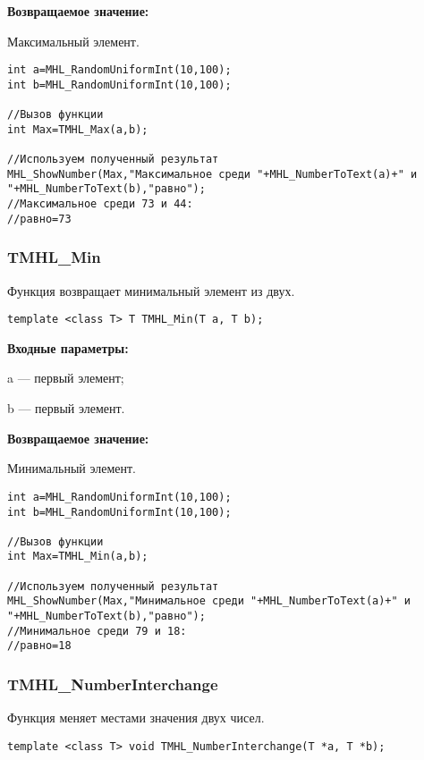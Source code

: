 \documentclass[a4paper,12pt]{article}
\begin{document}
\textbf{Возвращаемое значение:}

Максимальный элемент.


\begin{lstlisting}[label=code_use_TMHL_Max,caption=Пример использования]
int a=MHL_RandomUniformInt(10,100);
int b=MHL_RandomUniformInt(10,100);

//Вызов функции
int Max=TMHL_Max(a,b);

//Используем полученный результат
MHL_ShowNumber(Max,"Максимальное среди "+MHL_NumberToText(a)+" и "+MHL_NumberToText(b),"равно");
//Максимальное среди 73 и 44:
//равно=73
\end{lstlisting}

\subsubsection{TMHL\_Min}\label{TMHL_Min}

Функция возвращает минимальный элемент из двух.


\begin{lstlisting}[label=code_syntax_TMHL_Min,caption=Синтаксис]
template <class T> T TMHL_Min(T a, T b);
\end{lstlisting}

\textbf{Входные параметры:}

 a --- первый элемент;
	
 b --- первый элемент.

\textbf{Возвращаемое значение:}

Минимальный элемент.


\begin{lstlisting}[label=code_use_TMHL_Min,caption=Пример использования]
int a=MHL_RandomUniformInt(10,100);
int b=MHL_RandomUniformInt(10,100);

//Вызов функции
int Max=TMHL_Min(a,b);

//Используем полученный результат
MHL_ShowNumber(Max,"Минимальное среди "+MHL_NumberToText(a)+" и "+MHL_NumberToText(b),"равно");
//Минимальное среди 79 и 18:
//равно=18
\end{lstlisting}

\subsubsection{TMHL\_NumberInterchange}\label{TMHL_NumberInterchange}

Функция меняет местами значения двух чисел.


\begin{lstlisting}[label=code_syntax_TMHL_NumberInterchange,caption=Синтаксис]
template <class T> void TMHL_NumberInterchange(T *a, T *b);
\end{lstlisting}
\end{document}
